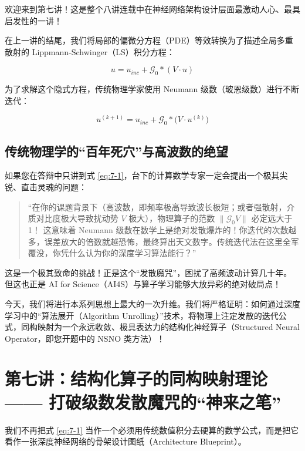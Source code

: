 \documentclass[12pt]{article}
\begin{document}
{欢迎来到第七讲！这是整个八讲连载中在神经网络架构设计层面最激动人心、最具启发性的一讲！

在上一讲的结尾，我们将局部的偏微分方程（PDE）等效转换为了描述全局多重散射的 Lippmann-Schwinger（LS）积分方程：

\begin{equation}
u = u_{inc} + \mathcal{G}_0 * (V \cdot u)
\label{eq:7-ls}
\end{equation}

为了求解这个隐式方程，传统物理学家使用 Neumann 级数（玻恩级数）进行不断迭代：

\begin{equation}
u^{(k+1)} = u_{inc} + \mathcal{G}_0 * \big(V \cdot u^{(k)}\big)
\label{eq:7-1}
\end{equation}

\subsection{传统物理学的“百年死穴”与高波数的绝望}

如果您在答辩中只讲到式 \eqref{eq:7-1}，台下的计算数学专家一定会提出一个极其尖锐、直击灵魂的问题：

\begin{quote}
“在你的课题背景下（高波数，即频率极高导致波长极短；或者强散射，介质对比度极大导致扰动势 $V$ 极大），物理算子的范数 $\|\mathcal{G}_0 V\|$ 必定远大于 1！
这意味着 Neumann 级数在数学上是绝对发散爆炸的！你迭代的次数越多，误差放大的倍数就越恐怖，最终算出天文数字。传统迭代法在这里全军覆没，你凭什么认为你的深度学习算法能行？”
\end{quote}

这是一个极其致命的挑战！正是这个“发散魔咒”，困扰了高频波动计算几十年。
但这也正是 AI for Science（AI4S）与算子学习能够大放异彩的绝对破局点！

今天，我们将进行本系列思想上最大的一次升维。我们将严格证明：如何通过深度学习中的“算法展开（Algorithm Unrolling）”技术，将物理上注定发散的迭代公式，同构映射为一个永远收敛、极具表达力的结构化神经算子（Structured Neural Operator，即您开题中的 NSNO 类方法）！

\section{第七讲：结构化算子的同构映射理论 —— 打破级数发散魔咒的“神来之笔”}

我们不再把式 \eqref{eq:7-1} 当作一个必须用传统数值积分去硬算的数学公式，而是把它看作一张深度神经网络的骨架设计图纸（Architecture Blueprint）。

}
\end{document}

